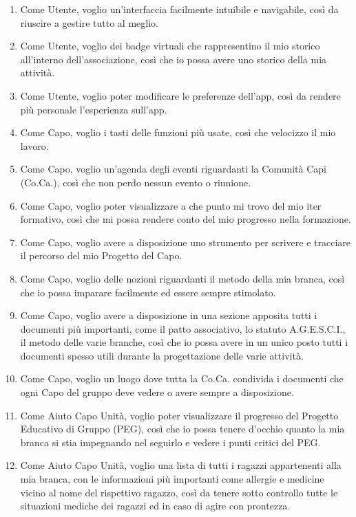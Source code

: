 \documentclass[11pt]{article}
\numberwithin{figure}{section}
\begin{document}
\begin{enumerate}[label=\textbf{US\arabic*:}]
  \item Come Utente, voglio un'interfaccia facilmente intuibile e navigabile, così da riuscire a gestire tutto al meglio.
  \item Come Utente, voglio dei badge virtuali che rappresentino il mio storico all’interno dell’associazione, così che io possa avere uno storico della mia attività.
  \item Come Utente, voglio poter modificare le preferenze dell’app, così da rendere più personale l’esperienza sull’app.
  \item Come Capo, voglio i tasti delle funzioni più usate, così che velocizzo il mio lavoro.
  \item Come Capo, voglio un'agenda degli eventi riguardanti la Comunità Capi (Co.Ca.), così che non perdo nessun evento o riunione.
  \item Come Capo, voglio poter visualizzare a che punto mi trovo del mio iter formativo, così che mi possa rendere conto del mio progresso nella formazione.
  \item Come Capo, voglio avere a disposizione uno strumento per scrivere e tracciare il percorso del mio Progetto del Capo.
  \item Come Capo, voglio delle nozioni riguardanti il metodo della mia branca, così che io possa imparare facilmente ed essere sempre stimolato.
  \item Come Capo, voglio avere a disposizione in una sezione apposita tutti i documenti più importanti, come il patto associativo, lo statuto A.G.E.S.C.I., il metodo delle varie branche, così che io possa avere in un unico posto tutti i documenti spesso utili durante la progettazione delle varie attività.
  \item Come Capo, voglio un luogo dove tutta la Co.Ca. condivida i documenti che ogni Capo del gruppo deve vedere o avere sempre a disposizione.
  \item Come Aiuto Capo Unità, voglio poter visualizzare il progresso del Progetto Educativo di Gruppo (PEG), così che io possa tenere d’occhio quanto la mia branca si stia impegnando nel seguirlo e vedere i punti critici del PEG.
  \item Come Aiuto Capo Unità, voglio una lista di tutti i ragazzi appartenenti alla mia branca, con le informazioni più importanti come allergie e medicine vicino al nome del rispettivo ragazzo, così da tenere sotto controllo tutte le situazioni mediche dei ragazzi ed in caso di agire con prontezza.

\end{enumerate}
\end{document}
